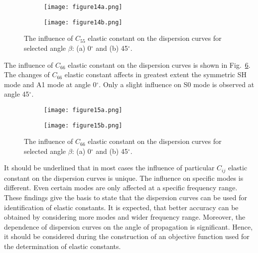 { \begin{figure} [h!]
 	\centering
 	\begin{subfigure}[b]{0.47\textwidth}
 		\centering
 		\texttt{[image: figure14a.png]}
 		\caption{}
 		\label{fig:C55_0}
 	\end{subfigure}
 	\hfill
 	\begin{subfigure}[b]{0.47\textwidth}
 		\centering
 		\texttt{[image: figure14b.png]}
 		\caption{}
 		\label{fig:C55_45}
 	\end{subfigure}
 	\caption{The influence of \(C_{55}\) elastic constant on the dispersion curves for selected angle \(\beta\): (a) 0\(^{\circ}\) and (b) 45\(^{\circ}\).} 
 	\label{fig:C55}
 \end{figure}
 
 The influence of \(C_{66}\) elastic constant on the dispersion curves is shown in Fig.~\ref{fig:C66}.
 The changes of \(C_{66}\) elastic constant affects in greatest extent the symmetric SH mode and A1 mode at angle 0\(^{\circ}\).
 Only a slight influence on S0 mode is observed at angle 45\(^{\circ}\).
 
 \begin{figure} [h!]
 	\centering
 	\begin{subfigure}[b]{0.47\textwidth}
 		\centering
 		\texttt{[image: figure15a.png]}
 		\caption{}
 		\label{fig:C66_0}
 	\end{subfigure}
 	\hfill
 	\begin{subfigure}[b]{0.47\textwidth}
 		\centering
 		\texttt{[image: figure15b.png]}
 		\caption{}
 		\label{fig:C66_45}
 	\end{subfigure}
 	\caption{The influence of \(C_{66}\) elastic constant on the dispersion curves for selected angle \(\beta\): (a) 0\(^{\circ}\) and (b) 45\(^{\circ}\).} 
 	\label{fig:C66}
 \end{figure}
 
 It should be underlined that in most cases the influence of  particular \(C_{ij}\) elastic constant on the dispersion curves is unique.
 The influence on specific modes is different.
 Even certain modes are only affected at a specific frequency range.
 These findings give the basis to state that the dispersion curves can be used for identification of elastic constants.
 It is expected, that better accuracy can be obtained by considering more modes and wider frequency range.
 Moreover, the dependence of dispersion curves on the angle of propagation is significant. 
 Hence, it should be considered during the construction of an objective function used for the determination of elastic constants.
}
